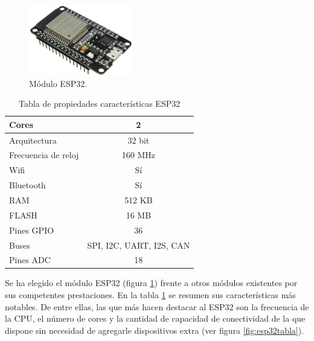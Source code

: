 	\begin{figure}[H]
		\centering
		\includegraphics[width=0.4\textwidth]{./img/esp32}
		\caption{Módulo ESP32. } 
		\label{fig:esp32}
	\end{figure} 


\begin{table}[H]
	\centering
	\begin{tabular}{|l|c|}
		\hline
		{\cellcolor[HTML]{EFEFEF}Cores}                                      & 2                             	\\ \hline
		{\cellcolor[HTML]{EFEFEF}Arquitectura}                               & 32 bit                         	\\ \hline
		{\cellcolor[HTML]{EFEFEF}Frecuencia de reloj} 						 & 160 MHz 							\\ \hline
		{\cellcolor[HTML]{EFEFEF}Wifi}                                       & Sí                             \\ \hline
		{\cellcolor[HTML]{EFEFEF}Bluetooth}                                  & Sí                             \\ \hline
		{\cellcolor[HTML]{EFEFEF}RAM}                                        & 512 KB                         \\ \hline
		{\cellcolor[HTML]{EFEFEF}FLASH}                                      & 16 MB                          \\ \hline
		{\cellcolor[HTML]{EFEFEF}Pines GPIO}                                 & 36                             \\ \hline
		{\cellcolor[HTML]{EFEFEF}Buses}                                      & SPI, I2C, UART, I2S, CAN       \\ \hline
		{\cellcolor[HTML]{EFEFEF}Pines ADC}                                  & 18                             \\ \hline
		
	\end{tabular}
	\caption{Tabla de propiedades características ESP32}
	\label{tabla:ESP32}
\end{table}

Se ha elegido el módulo ESP32 (figura \ref{fig:esp32}) frente a otros módulos existentes por sus competentes prestaciones. En la tabla \ref{tabla:ESP32} se resumen sus características más notables. De entre ellas, las que más hacen destacar al ESP32 son la frecuencia de la CPU, el número de cores y la cantidad de capacidad de conectividad de la que dispone sin necesidad de agregarle dispositivos extra (ver figura \ref{fig:esp32tabla}).


